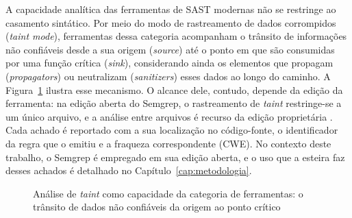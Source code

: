 A capacidade analítica das ferramentas de SAST modernas não se restringe ao casamento sintático. Por meio do modo de rastreamento de dados corrompidos (\textit{taint mode}), ferramentas dessa categoria acompanham o trânsito de informações não confiáveis desde a sua origem (\textit{source}) até o ponto em que são consumidas por uma função crítica (\textit{sink}), considerando ainda os elementos que propagam (\textit{propagators}) ou neutralizam (\textit{sanitizers}) esses dados ao longo do caminho. A Figura~\ref{fig:taint} ilustra esse mecanismo. O alcance dele, contudo, depende da edição da ferramenta: na edição aberta do Semgrep, o rastreamento de \textit{taint} restringe-se a um único arquivo, e a análise entre arquivos é recurso da edição proprietária \cite{semgrepdocs}. Cada achado é reportado com a sua localização no código-fonte, o identificador da regra que o emitiu e a fraqueza correspondente (CWE). No contexto deste trabalho, o Semgrep é empregado em sua edição aberta, e o uso que a esteira faz desses achados é detalhado no Capítulo~\ref{cap:metodologia}.

\begin{figure}[htpb]
    \centering
    \caption{Análise de \textit{taint} como capacidade da categoria de ferramentas: o trânsito de dados não confiáveis da origem ao ponto crítico}
    \label{fig:taint}
\end{figure}

